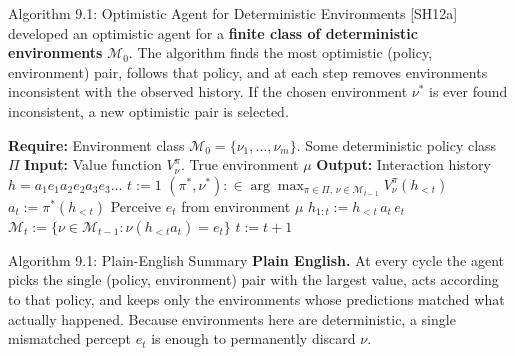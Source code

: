 \documentclass[aspectratio=169,10pt]{beamer}
\begin{document}
\begin{frame}{Algorithm 9.1: Optimistic Agent for Deterministic Environments}
  [SH12a] developed an optimistic agent for a \textbf{finite class of
  deterministic environments} $\mathcal{M}_0$. The algorithm finds the most
  optimistic (policy, environment) pair, follows that policy, and at each
  step removes environments inconsistent with the observed history. If the
  chosen environment $\nu^*$ is ever found inconsistent, a new optimistic
  pair is selected.

  {\small
  \begin{algorithmic}[1]
    \Statex \textbf{Require:} Environment class $\mathcal{M}_0=\{\nu_1,\dots,\nu_m\}$. Some deterministic policy class $\Pi$
    \Statex \textbf{Input:} Value function $V^\pi_\nu$. True environment $\mu$
    \Statex \textbf{Output:} Interaction history $h=a_1e_1a_2e_2a_3e_3\dots$
    \State $t := 1$
      \State $(\pi^*,\nu^*) :\in \arg\max_{\pi\in\Pi,\,\nu\in\mathcal{M}_{t-1}} V^\pi_\nu(h_{<t})$
       
        \State $a_t := \pi^*(h_{<t})$
        \State Perceive $e_t$ from environment $\mu$
        \State $h_{1:t} := h_{<t}\,a_t\,e_t$
        \State $\mathcal{M}_t := \{\nu\in\mathcal{M}_{t-1} : \nu(h_{<t}a_t)=e_t\}$ 
        \State $t := t+1$
      \EndWhile
    \EndWhile
  \end{algorithmic}}
\end{frame}

\begin{frame}{Algorithm 9.1: Plain-English Summary}
  \textbf{Plain English.} At every cycle the agent picks the single
  (policy, environment) pair with the largest value, acts according to that
  policy, and keeps only the environments whose predictions matched what
  actually happened. Because environments here are deterministic, a single
  mismatched percept $e_t$ is enough to permanently discard $\nu$.
\end{frame}
\end{document}
